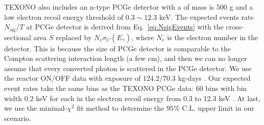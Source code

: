 \documentclass[prd,showpacs,preprintnumbers,amsmath,amssymb,twocolumn,superscriptaddress,notitlepage]{revtex4-2}
\begin{document}
\begin{widetext}
TEXONO also includes an n-type PCGe detector with a of mass is 500 g
and a low electron recoil energy threshold of $0.3\sim 12.3$ keV. 
The expected events rate $N_{\text{sig}}/T$ at PCGe detector is derived from Eq.~\eqref{eq:NsigEvents} with the cross-sectional area $S$ replaced by $N_e \sigma_C(E_\gamma)$, where $N_e$ is the electron number in the detector.
This is because the size of PCGe detector is comparable to the Compton scattering interaction length (a few cm), and then we can no longer assume that every converted photon is scattered in the PCGe detector. 
We use the reactor ON/OFF data with exposure of $124.2/70.3$ kg-days \cite{TEXONO:2014eky, TEXONO:2018nir}. 
Our expected event rates take the same bins as the TEXONO PCGe data: 
60 bins with bin width 0.2 keV 
for each in the electron recoil energy from 0.3 to 12.3 keV \cite{TEXONO:2018nir}. 
At last, we use the minimal-$\chi^2$ fit method to determine the $95\%$ C.L. upper limit in our scenario.




\end{widetext}
\end{document}
